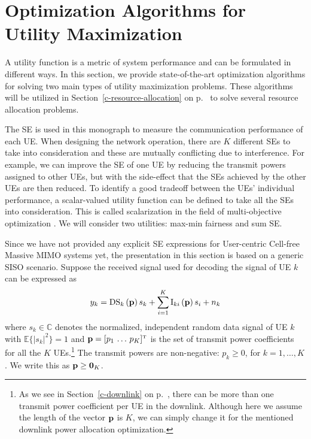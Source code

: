 \section{Optimization Algorithms for Utility Maximization}
\label{sec:optimization-algorithms}


A utility function is a metric of system performance and can be formulated in different ways.
In this section, we provide state-of-the-art optimization algorithms for solving two main types of utility maximization problems. These algorithms will be utilized in Section~\ref{c-resource-allocation} on p.~\pageref{c-resource-allocation} to solve several resource allocation problems.

The SE is used in this monograph to measure the communication performance of each UE. When designing the network operation, there are $K$ different SEs to take into consideration and these are mutually conflicting due to interference. For example, we can improve the SE of one UE by reducing the transmit powers assigned to other UEs, but with the side-effect that the SEs achieved by the other UEs are then reduced. To identify a good tradeoff between the UEs' individual performance, a scalar-valued utility function can be defined to take all the SEs into consideration. This is called scalarization in the field of multi-objective optimization \cite{Bjornson2014c}. We will consider two utilities: max-min fairness and sum SE.

Since we have not provided any explicit SE expressions for User-centric Cell-free Massive MIMO systems yet, the presentation in this section is based on a generic \gls{SISO} scenario. Suppose the received signal used for decoding the signal of UE $k$ can be expressed as 
\begin{align}
y_k=\mathrm{DS}_k\left(\mathbf{p}\right)s_k+\sum_{i=1}^K\mathrm{I}_{ki}\left(\mathbf{p}\right)s_i+n_k \label{eq:SISO-received}
\end{align}
where $s_k \in \mathbb{C}$ denotes the normalized, independent random data signal of UE $k$ with $\mathbb{E}\{|s_k|^2\}=1$ and $\vect{p}=[p_1 \, \ldots \, p_K]^{\Ttran}$ is the set of transmit power coefficients for all the $K$ UEs.\footnote{As we see in Section~\ref{c-downlink} on p.~\pageref{c-downlink}, there can be more than one transmit power coefficient per UE in the downlink. Although here we assume the length of the vector $\mathbf{p}$ is $K$, we can simply change it for the mentioned downlink power allocation optimization.} The transmit powers are non-negative: $p_k\geq0$, for $k=1,\ldots,K$. We write this as $\mathbf{p} \geq \mathbf{0}_K$.

